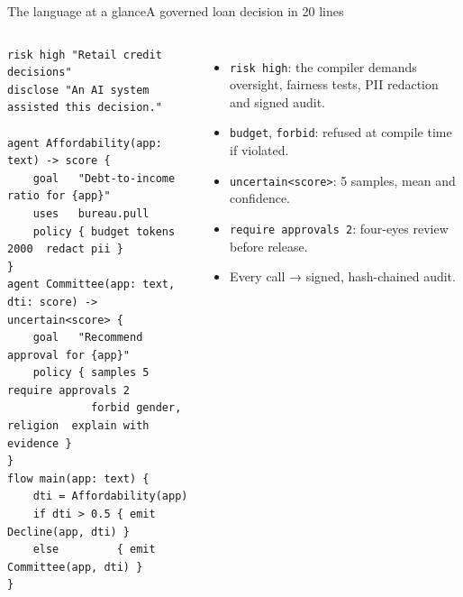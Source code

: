 \documentclass[aspectratio=169,10pt]{beamer}
\begin{document}
\begin{frame}[fragile]{The language at a glance}{A governed loan decision in 20 lines}
\begin{columns}[T]
\begin{lstlisting}[language=AlgoLang]
risk high "Retail credit decisions"
disclose "An AI system assisted this decision."

agent Affordability(app: text) -> score {
    goal   "Debt-to-income ratio for {app}"
    uses   bureau.pull
    policy { budget tokens 2000  redact pii }
}
agent Committee(app: text, dti: score) -> uncertain<score> {
    goal   "Recommend approval for {app}"
    policy { samples 5  require approvals 2
             forbid gender, religion  explain with evidence }
}
flow main(app: text) {
    dti = Affordability(app)
    if dti > 0.5 { emit Decline(app, dti) }
    else         { emit Committee(app, dti) }
}
\end{lstlisting}
\small
\begin{itemize}\setlength\itemsep{4pt}
\item \texttt{risk high}: the compiler demands oversight, fairness tests, PII redaction and signed audit.
\item \texttt{budget}, \texttt{forbid}: refused at compile time if violated.
\item \texttt{uncertain<score>}: 5 samples, mean and confidence.
\item \texttt{require approvals 2}: four-eyes review before release.
\item Every call → signed, hash-chained audit.
\end{itemize}
\end{columns}
\end{frame}
\end{document}

